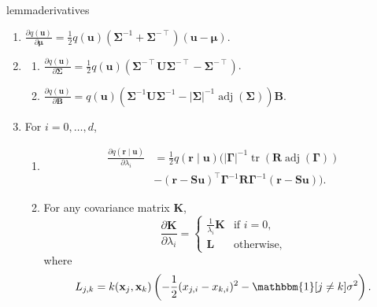 \documentclass{mpaper}
\DeclareMathOperator{\adj}{adj}
\DeclareMathOperator{\tr}{tr}
\begin{document}
\begin{restatable}{lemma}{derivatives} \label{lemma:derivatives}
  \leavevmode
  \begin{enumerate}
  \item $\frac{\partial q(\mathbf{u})}{\partial \bm\mu} =
    \frac{1}{2}q(\mathbf{u})(\bm\Sigma^{-1} + \bm\Sigma^{-\intercal})(\mathbf{u}
    - \bm\mu)$.
  \item
    \begin{enumerate}
    \item
      $\frac{\partial q(\mathbf{u})}{\partial \bm\Sigma} =
      \frac{1}{2}q(\mathbf{u})(\bm\Sigma^{-\intercal}\mathbf{U}\bm\Sigma^{-\intercal}
      - \bm\Sigma^{-\intercal})$.
    \item
      $\frac{\partial q(\mathbf{u})}{\partial \mathbf{B}} =
      q(\mathbf{u})(\bm\Sigma^{-1}\mathbf{U}\bm\Sigma^{-1} -
      |\bm\Sigma|^{-1}\adj(\bm\Sigma))\mathbf{B}$.
    \end{enumerate}
  \item For $i = 0, \dots, d$,
    \begin{enumerate}
    \item
      \begin{align*}
        \frac{\partial q(\mathbf{r} \mid \mathbf{u})}{\partial \lambda_i} &= \frac{1}{2}q(\mathbf{r} \mid \mathbf{u}) (|\bm\Gamma|^{-1} \tr(\mathbf{R} \adj(\bm\Gamma)) \\
                                                                          &- (\mathbf{r} - \mathbf{Su})^\intercal\bm\Gamma^{-1}\mathbf{R}\bm\Gamma^{-1}(\mathbf{r} - \mathbf{Su})).
      \end{align*}
    \item For any covariance matrix $\mathbf{K}$,
      \[
        \frac{\partial \mathbf{K}}{\partial \lambda_i} =
        \begin{cases}
          \frac{1}{\lambda_i}\mathbf{K} & \text{if } i = 0, \\
          \mathbf{L} & \text{otherwise,}
        \end{cases}
      \]
      where
      \[
        L_{j,k} = k(\mathbf{x}_j, \mathbf{x}_k) \left( -\frac{1}{2}(x_{j,i} -
          x_{k,i})^2 - \mathbbm{1}[j \ne k]\sigma^2 \right).
      \]
    \end{enumerate}
  \end{enumerate}
\end{restatable}
\end{document}
